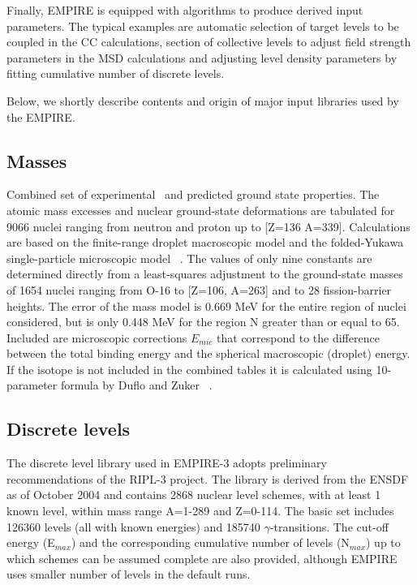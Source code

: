 Finally, EMPIRE is equipped with algorithms to produce derived input
parameters. The typical examples are automatic selection of target levels to
be coupled in the CC calculations, section of collective levels to adjust
field strength parameters in the MSD calculations and adjusting level
density parameters by fitting cumulative number of discrete levels.

Below, we shortly describe contents and origin of major input libraries used
by the EMPIRE.

\subsection{Masses}

Combined set of experimental~\cite{Audi} and predicted ground state
properties. The atomic mass excesses and nuclear ground-state deformations
are tabulated for 9066 nuclei ranging from neutron and proton up to {[}Z=136
A=339{]}. Calculations are based on the finite-range droplet macroscopic
model and the folded-Yukawa single-particle microscopic model~\cite{Moller95}%
. The values of only nine constants are determined directly from a
least-squares adjustment to the ground-state masses of 1654 nuclei ranging
from O-16 to {[}Z=106, A=263{]} and to 28 fission-barrier heights. The error
of the mass model is 0.669 MeV for the entire region of nuclei considered,
but is only 0.448 MeV for the region N greater than or equal to 65. Included
are microscopic corrections $E_{mic}$ that correspond to the difference
between the total binding energy and the spherical macroscopic (droplet)
energy. If the isotope is not included in the combined tables it is
calculated using 10-parameter formula by Duflo and Zuker ~\cite{Duflo:96}.

\subsection{Discrete levels}

The discrete level library used in EMPIRE-3 adopts preliminary
recommendations of the RIPL-3 project. The library is derived from the ENSDF
as of October 2004 and contains 2868 nuclear level schemes, with at least 1
known level, within mass range A=1-289 and Z=0-114. The basic set includes
126360 levels (all with known energies) and 185740 $\gamma$-transitions. The
cut-off energy (E$_{{max}}$) and the corresponding cumulative number of
levels (N$_{{max}}$) up to which schemes can be assumed complete are also
provided, although EMPIRE uses smaller number of levels in the default runs.

